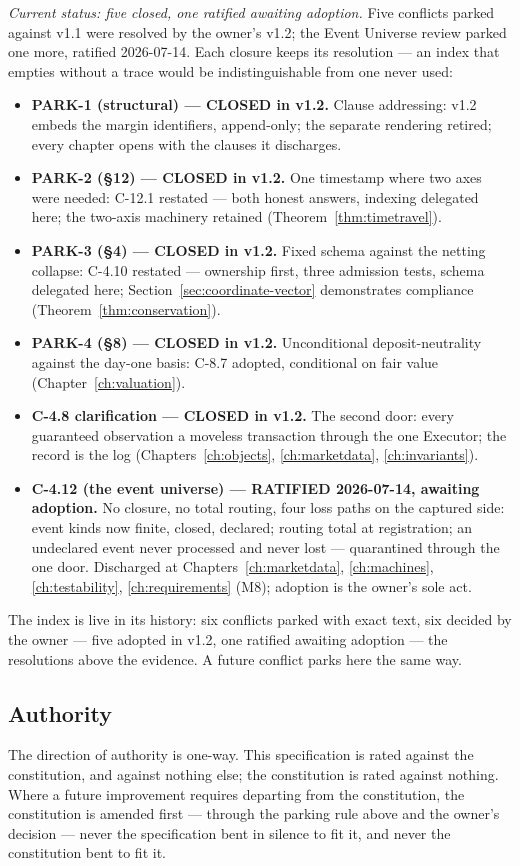 \emph{Current status: five closed, one ratified awaiting adoption.} Five conflicts parked
against v1.1 were resolved by the owner's v1.2; the Event Universe review parked one more,
ratified 2026-07-14. Each closure keeps its resolution --- an index that empties without a
trace would be indistinguishable from one never used:

\begin{itemize}
\item \textbf{PARK-1 (structural) --- CLOSED in v1.2.} Clause addressing: v1.2 embeds the
  margin identifiers, append-only; the separate rendering retired; every chapter opens with
  the clauses it discharges.
\item \textbf{PARK-2 (\S12) --- CLOSED in v1.2.} One timestamp where two axes were needed:
  C-12.1 restated --- both honest answers, indexing delegated here; the two-axis machinery
  retained (Theorem~\ref{thm:timetravel}).
\item \textbf{PARK-3 (\S4) --- CLOSED in v1.2.} Fixed schema against the netting collapse:
  C-4.10 restated --- ownership first, three admission tests, schema delegated here;
  Section~\ref{sec:coordinate-vector} demonstrates compliance
  (Theorem~\ref{thm:conservation}).
\item \textbf{PARK-4 (\S8) --- CLOSED in v1.2.} Unconditional deposit-neutrality against
  the day-one basis: C-8.7 adopted, conditional on fair value (Chapter~\ref{ch:valuation}).
\item \textbf{C-4.8 clarification --- CLOSED in v1.2.} The second door: every guaranteed
  observation a moveless transaction through the one Executor; the record is the log
  (Chapters~\ref{ch:objects}, \ref{ch:marketdata}, \ref{ch:invariants}).
\item \textbf{C-4.12 (the event universe) --- RATIFIED 2026-07-14, awaiting adoption.} No
  closure, no total routing, four loss paths on the captured side: event kinds now finite,
  closed, declared; routing total at registration; an undeclared event never processed and
  never lost --- quarantined through the one door. Discharged at
  Chapters~\ref{ch:marketdata}, \ref{ch:machines}, \ref{ch:testability},
  \ref{ch:requirements} (M8); adoption is the owner's sole act.
\end{itemize}

\noindent The index is live in its history: six conflicts parked with exact text, six
decided by the owner --- five adopted in v1.2, one ratified awaiting adoption --- the
resolutions above the evidence. A future conflict parks here the same way.

\subsection{Authority}

The direction of authority is one-way. This specification is rated against the
constitution, and against nothing else; the constitution is rated against nothing. Where a
future improvement requires departing from the constitution, the constitution is amended
first --- through the parking rule above and the owner's decision --- never the
specification bent in silence to fit it, and never the constitution bent to fit it.
